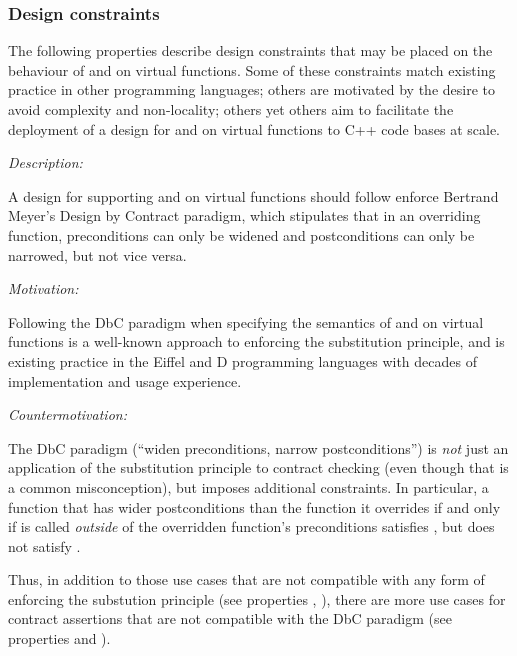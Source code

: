 \subsubsection{Design constraints}

The following properties describe design constraints that may be placed on the behaviour of  and  on virtual functions. Some of these constraints match existing practice in other programming languages; others are motivated by the desire to avoid complexity and non-locality; others yet others aim to facilitate the deployment of a design for  and  on virtual functions to C++ code bases at scale.



\emph{Description:}

A design for supporting  and  on virtual functions should follow enforce Bertrand Meyer's Design by Contract paradigm, which stipulates that in an overriding function, preconditions can only be widened and postconditions can only be narrowed, but not vice versa.

\emph{Motivation:}

Following the DbC paradigm when  specifying the semantics of  and  on virtual functions is a well-known approach to enforcing the substitution principle, and is existing practice in the Eiffel and D programming languages with decades of implementation and usage experience.

\emph{Countermotivation:} 

The DbC paradigm (``widen preconditions, narrow postconditions'') is \emph{not} just an application of the substitution principle to contract checking (even though that is a common misconception), but imposes additional constraints. In particular, a function that has wider postconditions than the function it overrides if and only if is called \emph{outside} of the overridden function's preconditions satisfies , but does not satisfy . 

Thus,  in addition to those use cases that are not compatible with any form of enforcing the substution principle (see properties , ), there are more use cases for contract assertions that are not compatible with the DbC paradigm (see properties   and ).

